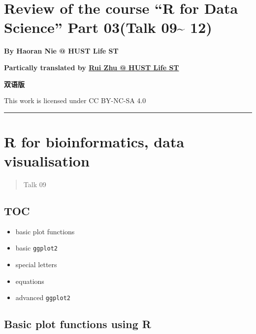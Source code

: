 \documentclass[
]{article}
\author{}
\date{}
\begin{document}
\hypertarget{review-of-the-course-r-for-data-science-part-03talk-09-12}{%
\section{Review of the course ``R for Data Science'' Part 03(Talk
09\textasciitilde{}
12)}\label{review-of-the-course-r-for-data-science-part-03talk-09-12}}

\textbf{By Haoran Nie @ HUST Life ST}

\textbf{Partically translated by
\href{https://github.com/1508324011}{Rui Zhu @ HUST Life ST}}

\textbf{双语版}

This work is licensed under CC BY-NC-SA 4.0

\begin{center}\rule{0.5\linewidth}{0.5pt}\end{center}
\tableofcontents

\newpage
{}
\hypertarget{r-for-bioinformatics-data-visualisation}{%
\section{R for bioinformatics, data
visualisation}\label{r-for-bioinformatics-data-visualisation}}

\begin{quote}
Talk 09
\end{quote}

\hypertarget{toc}{%
\subsection{TOC}\label{toc}}

\begin{itemize}
\item
  basic plot functions
\item
  basic \texttt{ggplot2}
\item
  special letters
\item
  equations
\item
  advanced \texttt{ggplot2}
\end{itemize}

\hypertarget{basic-plot-functions-using-r}{%
\subsection{Basic plot functions using
R}\label{basic-plot-functions-using-r}}
\end{document}
